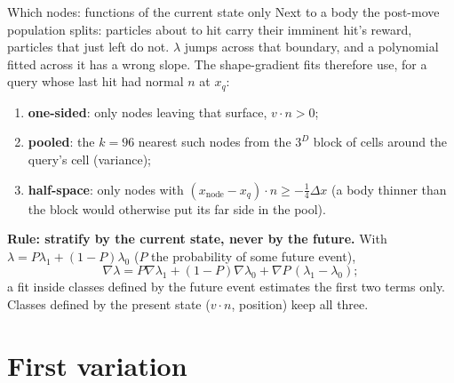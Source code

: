 \begin{frame}{Which nodes: functions of the current state only}
Next to a body the post-move population splits: particles about to hit carry their
imminent hit's reward, particles that just left do not.  $\lambda$ jumps across that
boundary, and a polynomial fitted across it has a wrong slope.  The shape-gradient fits
therefore use, for a query whose last hit had normal $n$ at $x_q$:
\begin{enumerate}
\item \textbf{one-sided}: only nodes leaving that surface, $v\cdot n > 0$;
\item \textbf{pooled}: the $k = 96$ nearest such nodes from the $3^D$ block of cells around
  the query's cell (variance);
\item \textbf{half-space}: only nodes with $(x_{\mathrm{node}} - x_q)\cdot n \ge -\tfrac14\Delta x$
  (a body thinner than the block would otherwise put its far side in the pool).
\end{enumerate}
\textbf{Rule: stratify by the current state, never by the future.}  With
$\lambda = P\lambda_1 + (1-P)\lambda_0$ ($P$ the probability of some future event),
\[
\nabla\lambda = P\nabla\lambda_1 + (1-P)\nabla\lambda_0 + \nabla P\,(\lambda_1-\lambda_0);
\]
a fit inside classes defined by the future event estimates the first two terms only.
Classes defined by the present state ($v\cdot n$, position) keep all three.
\end{frame}

\section{First variation}

